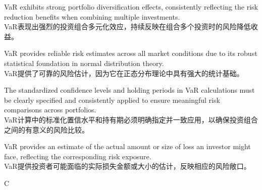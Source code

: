 \documentclass{article}
\begin{document}
\begin{choices}
    \item VaR exhibits strong portfolio diversification effects, consistently reflecting the risk reduction benefits when combining multiple investments.\\
    VaR表现出强烈的投资组合多元化效应，持续反映在组合多个投资时的风险降低收益。
    \item VaR provides reliable risk estimates across all market conditions due to its robust statistical foundation in normal distribution theory.\\
    VaR提供了可靠的风险估计，因为它在正态分布理论中具有强大的统计基础。
    \item The standardized confidence levels and holding periods in VaR calculations must be clearly specified and consistently applied to ensure meaningful risk comparisons across portfolios.\\
    VaR计算中的标准化置信水平和持有期必须明确指定并一致应用，以确保投资组合之间的有意义的风险比较。
    \item VaR provides an estimate of the actual amount or size of loss an investor might face, reflecting the corresponding risk exposure.\\
    VaR提供投资者可能面临的实际损失金额或大小的估计，反映相应的风险敞口。
\end{choices}

\begin{correctanswer}
    C
\end{correctanswer}
\end{document}
